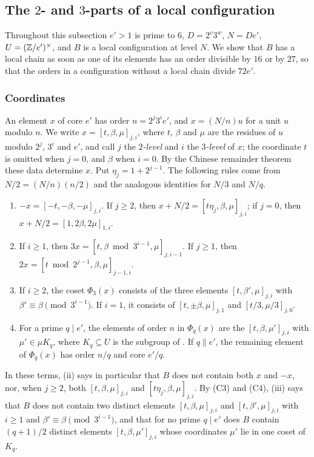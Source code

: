 \subsection{The \texorpdfstring{$2$}{2}- and \texorpdfstring{$3$}{3}-parts of
a local configuration}\label{ssec:twothree}

Throughout this subsection $e'>1$ is prime to $6$, $D=2^{v}3^{w}$, $N=De'$,
$U=(\mathbb{Z}/e')^{\times}$, and $B$ is a local configuration at level $N$. We
show that $B$ has a local chain as soon as one of its elements has an order
divisible by $16$ or by $27$, so that the orders in a configuration without a
local chain divide $72e'$.

\subsubsection*{Coordinates}
An element $x$ of core $e'$ has order $n=2^{j}3^{i}e'$, and $x=(N/n)u$ for a
unit $u$ modulo $n$. We write $x=[t,\beta,\mu]_{j,i}$, where $t$, $\beta$ and
$\mu$ are the residues of $u$ modulo $2^{j}$, $3^{i}$ and $e'$, and call $j$
the \emph{$2$-level} and $i$ the \emph{$3$-level} of $x$; the coordinate $t$
is omitted when $j=0$, and $\beta$ when $i=0$. By the Chinese remainder
theorem these data determine $x$. Put $\eta_{j}=1+2^{j-1}$. The following
rules come from $N/2=(N/n)(n/2)$ and the analogous identities for $N/3$ and
$N/q$.
\begin{enumerate}[label=\textup{(C\arabic*)}]
\item $-x=[-t,-\beta,-\mu]_{j,i}$. If $j\ge2$, then
$x+N/2=[t\eta_{j},\beta,\mu]_{j,i}$; if $j=0$, then
$x+N/2=[1,2\beta,2\mu]_{1,i}$.
\item If $i\ge1$, then $3x=[t,\beta\bmod 3^{i-1},\mu]_{j,i-1}$. If $j\ge1$,
then $2x=[t\bmod 2^{j-1},\beta,\mu]_{j-1,i}$.
\item If $i\ge2$, the coset $\Phi_{3}(x)$ consists of the three elements
$[t,\beta',\mu]_{j,i}$ with $\beta'\equiv\beta\pmod{3^{i-1}}$. If $i=1$, it
consists of $[t,\pm\beta,\mu]_{j,1}$ and $[t/3,\mu/3]_{j,0}$.
\item For a prime $q\mid e'$, the elements of order $n$ in $\Phi_{q}(x)$ are
the $[t,\beta,\mu']_{j,i}$ with $\mu'\in\mu K_{q}$, where $K_{q}\subseteq U$
is the subgroup of . If $q\parallel e'$, the remaining element
of $\Phi_{q}(x)$ has order $n/q$ and core $e'/q$.
\end{enumerate}
In these terms, (ii) says in particular that $B$ does not
contain both $x$ and $-x$, nor, when $j\ge2$, both $[t,\beta,\mu]_{j,i}$ and
$[t\eta_{j},\beta,\mu]_{j,i}$. By (C3) and (C4), (iii)
says that $B$ does not contain two distinct elements $[t,\beta,\mu]_{j,i}$
and $[t,\beta',\mu]_{j,i}$ with $i\ge1$ and $\beta'\equiv\beta\pmod{3^{i-1}}$,
and that for no prime $q\mid e'$ does $B$ contain $(q+1)/2$ distinct elements
$[t,\beta,\mu']_{j,i}$ whose coordinates $\mu'$ lie in one coset of $K_{q}$.

